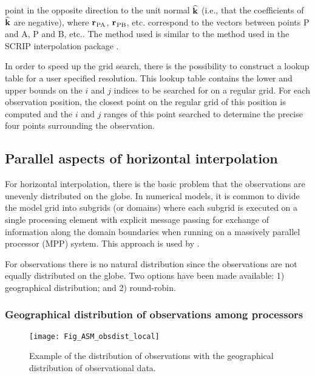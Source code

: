 \documentclass[../main/NEMO_manual]{subfiles}
\begin{document}
point in the opposite direction to the unit normal $\widehat{\bf k}$
(i.e., that the coefficients of $\widehat{\bf k}$ are negative),
where ${{\bf r}_{}}_{\rm PA}$, ${{\bf r}_{}}_{\rm PB}$, etc. correspond to
the vectors between points P and A, P and B, etc..
The method used is similar to the method used in the SCRIP interpolation package \citep{Jones_1998}.

In order to speed up the grid search, there is the possibility to construct a lookup table for a user specified resolution.
This lookup table contains the lower and upper bounds on the $i$ and $j$ indices to
be searched for on a regular grid.
For each observation position, the closest point on the regular grid of this position is computed and
the $i$ and $j$ ranges of this point searched to determine the precise four points surrounding the observation. 

\subsection{Parallel aspects of horizontal interpolation}
\label{subsec:OBS_parallel}

For horizontal interpolation, there is the basic problem that
the observations are unevenly distributed on the globe.
In numerical models, it is common to divide the model grid into subgrids (or domains) where
each subgrid is executed on a single processing element with explicit message passing for
exchange of information along the domain boundaries when running on a massively parallel processor (MPP) system.
This approach is used by \NEMO.

For observations there is no natural distribution since the observations are not equally distributed on the globe. 
Two options have been made available:
1) geographical distribution;
and 2) round-robin.

\subsubsection{Geographical distribution of observations among processors}

\begin{figure}
  \begin{center}
    \texttt{[image: Fig\_ASM\_obsdist\_local]}
    \caption{
      \protect\label{fig:obslocal}
      Example of the distribution of observations with the geographical distribution of observational data.
    }
  \end{center}
\end{figure}
\end{document}
